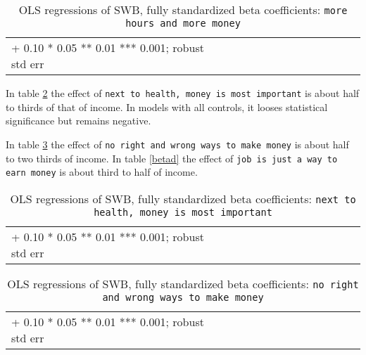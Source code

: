 \documentclass[10pt, letterpaper]{article}
\begin{document}
\begin{spacing}{1.8}
\begin{spacing}{.9} \begin{table}[H]\centering   \begin{scriptsize} \begin{tabular}{p{1.8in}p{.5in}p{.5in}p{.5in}p{.5in}p{.5in}p{.5in}p{.5in}p{.5in}p{.5in}p{.5 in}p{.5in}p{.5 in}}\hline  \hline + 0.10 * 0.05 ** 0.01 *** 0.001; robust std err \end{tabular}\end{scriptsize}\caption{\label{betaa}OLS regressions of SWB, fully standardized beta coefficients: \texttt{more hours and more money}}\end{table} \end{spacing}
 
In table \ref{betab} the effect of \texttt{next to  health, money is most  important} is about half to thirds of
that of income. In models with all controls, it looses statistical significance
but remains negative. 

In table \ref{betac} the effect of \texttt{no right  and wrong ways to  make
  money}  is about half to two thirds of income. In table \ref{betad} the effect of \texttt{job is just a way to earn money} is
about third to half  of income.

\begin{spacing}{.9} \begin{table}[H]\centering   \begin{scriptsize} \begin{tabular}{p{1.8in}p{.5in}p{.5in}p{.5in}p{.5in}p{.5in}p{.5in}p{.5in}p{.5in}p{.5in}p{.5 in}p{.5in}p{.5 in}}\hline  \hline + 0.10 * 0.05 ** 0.01 *** 0.001; robust std err \end{tabular}\end{scriptsize}\caption{\label{betab}OLS regressions of SWB, fully standardized beta coefficients: \texttt{next to  health, money is most  important}}\end{table} \end{spacing}

\begin{spacing}{.9} \begin{table}[H]\centering   \begin{scriptsize} \begin{tabular}{p{1.8in}p{.5in}p{.5in}p{.5in}p{.5in}p{.5in}p{.5in}p{.5in}p{.5in}p{.5in}p{.5 in}p{.5in}p{.5 in}}\hline  \hline + 0.10 * 0.05 ** 0.01 *** 0.001; robust std err \end{tabular}\end{scriptsize}\caption{\label{betac}OLS regressions of SWB, fully standardized beta coefficients: \texttt{no right  and wrong ways to  make money}}\end{table} \end{spacing}


\end{spacing}
\end{document}
